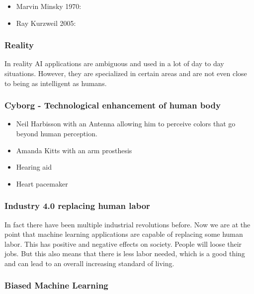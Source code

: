 \begin{itemize}
    \item Marvin Minsky 1970: 
    \item Ray Kurzweil 2005: 
\end{itemize}

\subsubsection*{Reality}

In reality AI applications are ambiguous and used in a lot of day to day situations. However, they are specialized in certain areas and are not even close to being as intelligent as humans.

\subsubsection*{Cyborg - Technological enhancement of human body}

\begin{itemize}
    \item Neil Harbisson with an Antenna allowing him to perceive colors that go beyond human perception.
    \item Amanda Kitts with an arm prosthesis
    \item Hearing aid
    \item Heart pacemaker
\end{itemize}

\subsubsection*{Industry 4.0 replacing human labor}

In fact there have been multiple industrial revolutions before. Now we are at the point that machine learning applications are capable of replacing some human labor. This has positive and negative effects on society. People will loose their jobs. But this also means that there is less labor needed, which is a good thing and can lead to an overall increasing standard of living.

\subsubsection*{Biased Machine Learning}

